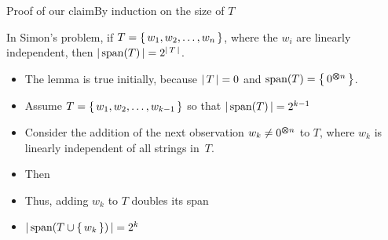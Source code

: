 \begin{frame}{Proof of our claim}{By induction on the size of $T$}

\begin{lemma}
In Simon's problem, if $T=\left\{\,w_{1}, w_{2},\ldots,w_{n}\,\right\}$, where the $w_{i}$ are linearly independent, then ${|\,{\mbox{span}(T)}\,|}=2^{{|\,T\,|}}$.
\end{lemma}
\begin{itemize}
    \item The lemma is true initially, because ${|\,T\,|}=0$ and ${\mbox{span}(T)}=\left\{\,0^{\bm{\otimes} n}\,\right\}$.
    \item Assume $T=\left\{\,w_{1},w_{2},\ldots,w_{k-1}\,\right\}$ so that ${|\,{\mbox{span}(T)}\,|}=2^{k-1}$
    \item Consider the addition of the next observation $w_{k}\not=0^{\bm{\otimes} n}$ to $T$, where $w_k$ is linearly independent of all strings in~$T$.
    \item Then 
    \item Thus, adding $w_{k}$ to $T$ doubles its span
    \item ${|\,{\mbox{span}(T \cup \left\{\,w_{k}\,\right\})}\,|}=2^k$ \QED{}
\end{itemize}
    
\end{frame}

